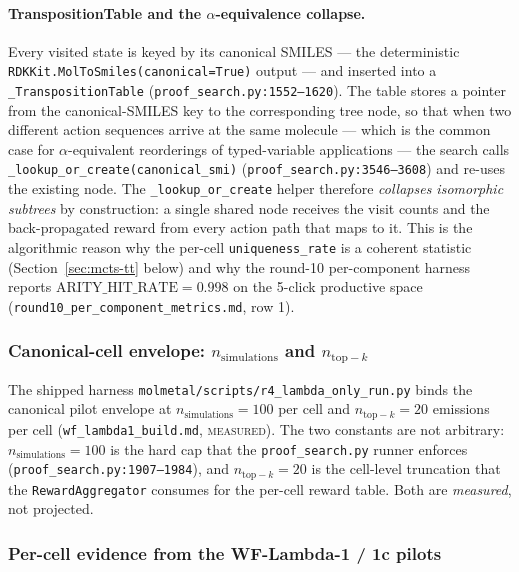 \paragraph{TranspositionTable and the $\alpha$-equivalence collapse.}
Every visited state is keyed by its canonical SMILES --- the
deterministic \texttt{RDKKit.MolToSmiles(canonical=True)} output
--- and inserted into a \texttt{\_TranspositionTable}
(\texttt{proof\_search.py:1552--1620}).  The table stores a
pointer from the canonical-SMILES key to the corresponding tree
node, so that when two different action sequences arrive at the
same molecule --- which is the common case for $\alpha$-equivalent
reorderings of typed-variable applications --- the search calls
\texttt{\_lookup\_or\_create(canonical\_smi)}
(\texttt{proof\_search.py:3546--3608}) and re-uses the existing
node.  The \texttt{\_lookup\_or\_create} helper therefore
\emph{collapses isomorphic subtrees} by construction: a single
shared node receives the visit counts and the back-propagated
reward from every action path that maps to it.  This is the
algorithmic reason why the per-cell \texttt{uniqueness\_rate}
is a coherent statistic (Section~\ref{sec:mcts-tt} below) and
why the round-10 per-component harness reports
$\mathrm{ARITY\_HIT\_RATE}=0.998$ on the
5-click productive space
(\texttt{round10\_per\_component\_metrics.md}, row 1).

\subsubsection{Canonical-cell envelope: $n_{\mathrm{simulations}}$ and $n_{\mathrm{top-}k}$}
\label{sec:mcts-budget-legacy}

The shipped harness \texttt{molmetal/scripts/r4\_lambda\_only\_run.py}
binds the canonical pilot envelope at
$n_{\mathrm{simulations}}=100$ per cell and $n_{\mathrm{top-}k}=20$
emissions per cell
(\texttt{wf\_lambda1\_build.md}, \textsc{measured}).  The two
constants are not arbitrary: $n_{\mathrm{simulations}}=100$ is the
hard cap that the \texttt{proof\_search.py} runner enforces
(\texttt{proof\_search.py:1907--1984}), and $n_{\mathrm{top-}k}=20$
is the cell-level truncation that the
\texttt{RewardAggregator} consumes for the per-cell reward table.
Both are \emph{measured}, not projected.

\subsubsection{Per-cell evidence from the WF-Lambda-1 / 1c pilots}
\label{sec:mcts-pilot-evidence-legacy}

